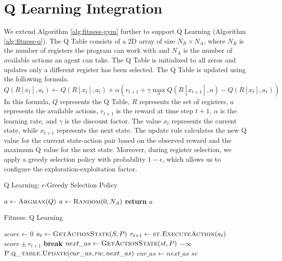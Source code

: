 \documentclass[12pt, final]{dalcsthesis}
\begin{document}
\section{Q Learning Integration}
We extend Algorithm \ref{alg:fitness-gym} further to support Q Learning (Algorithm \ref{alg:fitness-q}).
The Q Table consists of a 2D array of size $N_R \times N_A$, where $N_R$ is the number of registers the program can work with and $N_A$ is the number of available actions an agent can take. The Q Table is initialized to all zeros and updates only a different register has been selected. The Q Table is updated using the following formula.
\begin{equation}
	Q(R[x_t], a_t) \leftarrow Q(R[x_t], a_t) + \alpha \left(r_{t+1} + \gamma \max_a Q(R[x_{t+1}], a) - Q(R[x_t], a_t)\right)
\end{equation}
In this formula, $Q$ represents the Q Table, $R$ represents the set of registers, $a$ represents the available actions, $r_{t+1}$ is the reward at time step $t+1$, $\alpha$ is the learning rate, and $\gamma$ is the discount factor. The value $x_t$ represents the current state, while $x_{t+1}$ represents the next state. The update rule calculates the new Q value for the current state-action pair based on the observed reward and the maximum Q value for the next state.
Moreover, during register selection, we apply a greedy selection policy with probability $1-\epsilon$, which allows us to configure the exploration-exploitation factor.

\begin{algorithm}[hb]
    \caption{Q Learning: $\epsilon$-Greedy Selection Policy}
    \label{alg:q-learning-greedy-selection}
    \begin{algorithmic}
        \State $a \gets \Call{Argmax}{Q}$
        \State $a \gets \Call{Random}{0, N_A}$
        \EndIf
        \State \textbf{return} $a$
    \end{algorithmic}

\end{algorithm}

\begin{algorithm}[hb]
	\caption{Fitness: Q Learning}
	\label{alg:fitness-q}
	\begin{algorithmic}[1]
		\State $score \gets 0$
		\State $a_{t} \gets \Call{GetActionState}{S, P}$
		\State $r_{t + 1} \gets \Call{st.ExecuteAction}{a_{t}}$
		\State $score \pm r_{t + 1}$
		\State \textbf{break}
		\EndIf
		\State $next\_as \gets \Call{GetActionState}{st, P}$
		\State \Return $-\infty$
		\EndIf
		\State $\Call{P.q\_table.Update}{cur\_as, rw, next\_as}$
		\EndIf
		\State $cur\_as \gets next\_as$
		\EndWhile
		\State \Return $sc$
	\end{algorithmic}
\end{algorithm}
\end{document}
